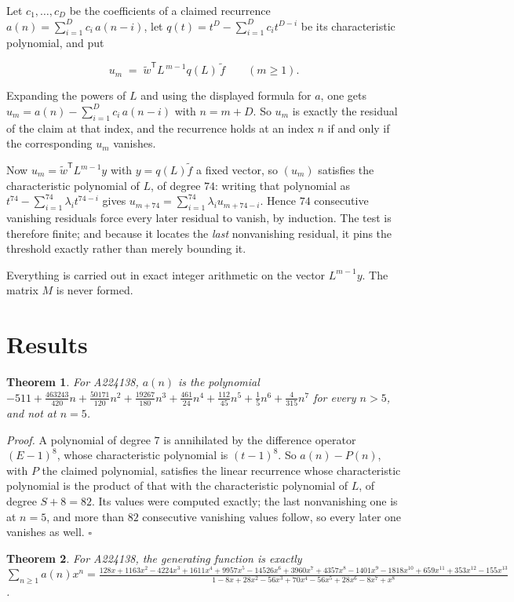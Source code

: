 \documentclass[11pt]{article}
\newtheorem{theorem}{Theorem}
\theoremstyle{definition}
\begin{document}
Let $c_1,\dots,c_D$ be the coefficients of a claimed recurrence $a(n) = \sum_{i=1}^{D} c_i\,a(n-i)$, let $q(t) = t^{D} - \sum_{i=1}^{D} c_i t^{D-i}$ be its characteristic polynomial, and put

\[u_m \;=\; \tilde w^{\mathsf T} L^{\,m-1} q(L)\,\tilde f \qquad (m \ge 1).\]

Expanding the powers of $L$ and using the displayed formula for $a$, one gets $u_m = a(n) - \sum_{i=1}^{D} c_i\,a(n-i)$ with $n = m + D$. So $u_m$ is exactly the residual of the claim at that index, and the recurrence holds at an index $n$ if and only if the corresponding $u_m$ vanishes.

Now $u_m = \tilde w^{\mathsf T} L^{m-1} y$ with $y = q(L)\tilde f$ a fixed vector, so $(u_m)$ satisfies the characteristic polynomial of $L$, of degree $74$: writing that polynomial as $t^{74} - \sum_{i=1}^{74} \lambda_i t^{74-i}$ gives $u_{m+74} = \sum_{i=1}^{74} \lambda_i u_{m+74-i}$. Hence $74$ consecutive vanishing residuals force every later residual to vanish, by induction. The test is therefore finite; and because it locates the {\itshape last} nonvanishing residual, it pins the threshold exactly rather than merely bounding it.

Everything is carried out in exact integer arithmetic on the vector $L^{m-1}y$. The matrix $M$ is never formed.

\section{Results}

\begin{theorem} For A224138, $a(n)$ is the polynomial $-511 + \frac{463243}{420}n + \frac{50171}{120}n^{2} + \frac{19267}{180}n^{3} + \frac{461}{24}n^{4} + \frac{112}{45}n^{5} + \frac{1}{5}n^{6} + \frac{4}{315}n^{7}$ for every $n > 5$, and not at $n = 5$.\end{theorem}

{\itshape Proof.} A polynomial of degree $7$ is annihilated by the difference operator $(E-1)^{8}$, whose characteristic polynomial is $(t-1)^{8}$. So $a(n) - P(n)$, with $P$ the claimed polynomial, satisfies the linear recurrence whose characteristic polynomial is the product of that with the characteristic polynomial of $L$, of degree $S + 8 = 82$. Its values were computed exactly; the last nonvanishing one is at $n = 5$, and more than $82$ consecutive vanishing values follow, so every later one vanishes as well. $\square$

\begin{theorem} For A224138, the generating function is exactly $\sum_{n\ge 1} a(n)x^n = \frac{128x + 1163x^{2} - 4224x^{3} + 1611x^{4} + 9957x^{5} - 14526x^{6} + 3960x^{7} + 4357x^{8} - 1401x^{9} - 1818x^{10} + 659x^{11} + 353x^{12} - 155x^{13}}{1 - 8x + 28x^{2} - 56x^{3} + 70x^{4} - 56x^{5} + 28x^{6} - 8x^{7} + x^{8}}$.\end{theorem}
\end{document}
